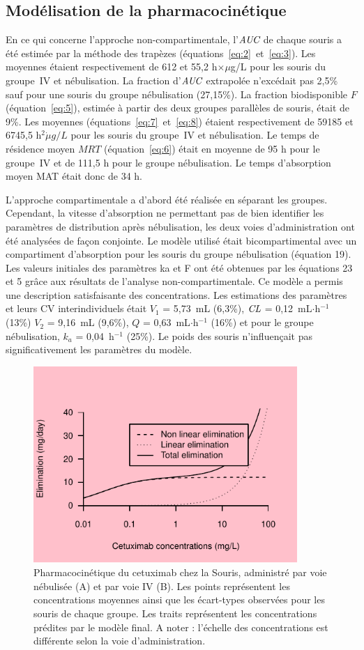 \subsection{Modélisation de la pharmacocinétique}
En ce qui concerne l'approche non-compartimentale, l'$\operatorname{\textit{AUC}}$ de chaque souris a été estimée par la méthode des trapèzes (équations~\ref{eq:2}~et~\ref{eq:3}). Les moyennes étaient respectivement de 612 et 55,2 h$\times \mu$g/L pour les souris du groupe~IV et nébulisation. La fraction d'$\operatorname{\textit{AUC}}$ extrapolée n'excédait pas 2,5\% sauf pour une souris du groupe nébulisation (27,15\%). La fraction biodisponible $F$ (équation~\ref{eq:5}), estimée à partir des deux groupes parallèles de souris, était de 9\%. Les moyennes (équations~\ref{eq:7}~et~\ref{eq:8}) étaient respectivement de 59185 et 6745,5 h$^2\dot \mu g/L$ pour les souris du groupe~IV et nébulisation. Le temps de résidence moyen $MRT$ (équation~\ref{eq:6}) était en moyenne de 95 h pour le groupe~IV et de 111,5 h pour le groupe nébulisation. Le temps d'absorption moyen MAT était donc de 34 h. 

L'approche compartimentale a d'abord été réalisée en séparant les groupes. Cependant, la vitesse d'absorption ne permettant pas de bien identifier les paramètres de distribution après nébulisation, les deux voies d'administration ont été analysées de façon conjointe. Le modèle utilisé était bicompartimental avec un compartiment d'absorption pour les souris du groupe nébulisation (équation 19). Les valeurs initiales des paramètres ka et F ont été obtenues par les équations 23 et 5 grâce aux résultats de l'analyse non-compartimentale. Ce modèle a permis une description satisfaisante des concentrations. Les estimations des paramètres et leurs CV interindividuels était $V_1$ = 5,73~mL (6,3\%), $\operatorname{\textit{CL}}$ = 0,12~mL$\cdot$h$^{-1}$ (13\%) $V_2$ = 9,16~mL (9,6\%), $Q$ = 0,63~mL$\cdot$h$^{-1}$ (16\%) et pour le groupe nébulisation, $k_a$ = 0,04~h$^{-1}$ (25\%). Le poids des souris n'influençait pas significativement les paramètres du modèle.
\begin{figure}[htbp]
	\centering
		\includegraphics[width=10cm]{images/essai001.pdf}
	\caption{Pharmacocinétique du cetuximab chez la Souris, administré par voie nébulisée (A) et par voie IV (B). Les points représentent les concentrations moyennes ainsi que les écart-types observées pour les souris de chaque groupe. Les traits représentent les concentrations prédites par le modèle final. A noter : l'échelle des concentrations est différente selon la voie d'administration.}
	\label{fig:33}
\end{figure}

